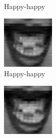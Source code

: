 \begin{figure}
\begin{subfigure}[b]{0.15\textwidth}
		\caption{Happy-happy}
		\label{fig:timeseriesHappy:g}
	\end{subfigure}
	\begin{subfigure}[b]{0.15\textwidth}
		\includegraphics[width=\textwidth]{./img/timeseriesHappy/S026_006_00000008.png}
		\caption{Happy-happy}
		\label{fig:timeseriesHappy:h}
	\end{subfigure}
	\begin{subfigure}[b]{0.15\textwidth}
		\includegraphics[width=\textwidth]{./img/timeseriesHappy/S026_006_00000009.png}

\end{subfigure}
\end{figure}
